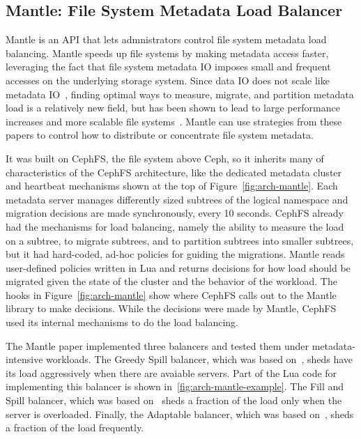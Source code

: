 \subsection{Mantle: File System Metadata Load Balancer}
\label{sec:mantle}

Mantle is an API that lets admnistrators control file system metadata load
balancing. Mantle speeds up file systems by making metadata access faster,
leveraging the fact that file system metadata IO imposes small and frequent
accesses on the underlying storage system. Since data IO does not scale like
metadata IO~\cite{roselli:atec2000-FS-workloads}, finding optimal ways to
measure, migrate, and partition metadata load is a relatively new field, but
has been shown to lead to large performance increases and more scalable file
systems~\cite{zheng:pdsw2014-batchfs, grider:pdsw2015-marfs,
ren:sc2014-indexfs, patil:fast2011-giga+, brandt:msst2003-lh}.  Mantle can use
strategies from these papers to control how to distribute or concentrate file
system metadata.

It was built on CephFS, the file system above Ceph, so it inherits many of
characteristics of the CephFS architecture, like the dedicated metadata cluster
and heartbeat mechanisms shown at the top of Figure~\ref{fig:arch-mantle}.
Each metadata server manages differently sized subtrees of the logical
namespace and migration decisions are made synchronously, every 10 seconds.
CephFS already had the mechanisms for load balancing, namely the ability to
measure the load on a subtree, to migrate subtrees, and to partition subtrees
into smaller subtrees, but it had hard-coded, ad-hoc policies for guiding the
migrations.  Mantle reads user-defined policies written in Lua and returns
decisions for how load should be migrated given the state of the cluster and
the behavior of the workload. The hooks in Figure~\ref{fig:arch-mantle} show
where CephFS calls out to the Mantle library to make decisions. While the
decisions were made by Mantle, CephFS used its internal mechanisms to do the
load balancing.

The Mantle paper implemented three balancers and tested them under
metadata-intensive workloads. The Greedy Spill balancer, which was based
on~\cite{patil:fast2011-giga+}, sheds have its load aggressively when there are
avaiable servers. Part of the Lua code for implementing this balancer is shown
in~\ref{fig:arch-mantle-example}.  The Fill and Spill balancer, which was based
on~\cite{pai:asplos1998-lard} sheds a fraction of the load only when the server
is overloaded. Finally, the Adaptable balancer, which was based
on~\cite{weil:sc2004-dyn-metadata, weil:osdi2006-ceph}, sheds a fraction of the
load frequently.

